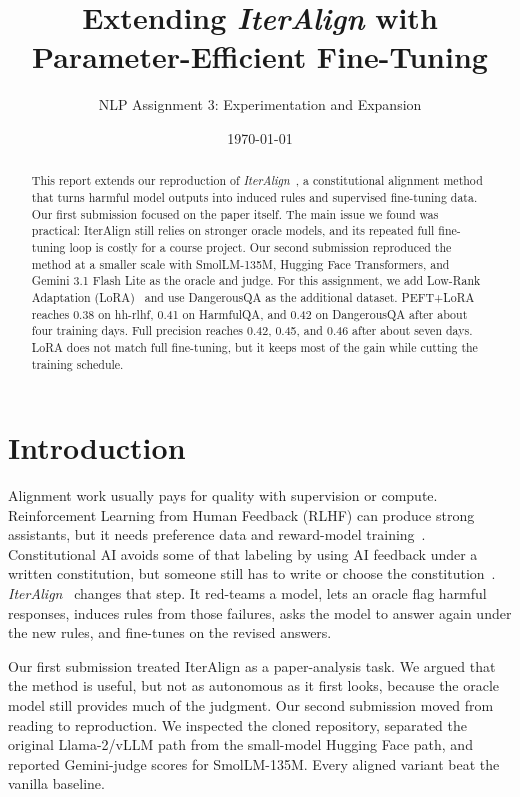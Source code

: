 \documentclass[11pt]{article}
\title{Extending \textit{IterAlign} with Parameter-Efficient Fine-Tuning}
\author{NLP Assignment 3: Experimentation and Expansion}
\date{\today}
\begin{document}
\maketitle

\begin{abstract}
This report extends our reproduction of \textit{IterAlign}~\cite{chen2024iteralign}, a constitutional alignment method that turns harmful model outputs into induced rules and supervised fine-tuning data. Our first submission focused on the paper itself. The main issue we found was practical: IterAlign still relies on stronger oracle models, and its repeated full fine-tuning loop is costly for a course project. Our second submission reproduced the method at a smaller scale with SmolLM-135M, Hugging Face Transformers, and Gemini 3.1 Flash Lite as the oracle and judge. For this assignment, we add Low-Rank Adaptation (LoRA)~\cite{hu2022lora} and use DangerousQA as the additional dataset. PEFT+LoRA reaches 0.38 on hh-rlhf, 0.41 on HarmfulQA, and 0.42 on DangerousQA after about four training days. Full precision reaches 0.42, 0.45, and 0.46 after about seven days. LoRA does not match full fine-tuning, but it keeps most of the gain while cutting the training schedule.
\end{abstract}

\section{Introduction}
\label{sec:intro}

Alignment work usually pays for quality with supervision or compute. Reinforcement Learning from Human Feedback (RLHF) can produce strong assistants, but it needs preference data and reward-model training~\cite{ouyang2022instructgpt}. Constitutional AI avoids some of that labeling by using AI feedback under a written constitution, but someone still has to write or choose the constitution~\cite{bai2022cai}. \textit{IterAlign}~\cite{chen2024iteralign} changes that step. It red-teams a model, lets an oracle flag harmful responses, induces rules from those failures, asks the model to answer again under the new rules, and fine-tunes on the revised answers.

Our first submission treated IterAlign as a paper-analysis task. We argued that the method is useful, but not as autonomous as it first looks, because the oracle model still provides much of the judgment. Our second submission moved from reading to reproduction. We inspected the cloned repository, separated the original Llama-2/vLLM path from the small-model Hugging Face path, and reported Gemini-judge scores for SmolLM-135M. Every aligned variant beat the vanilla baseline.
\end{document}
